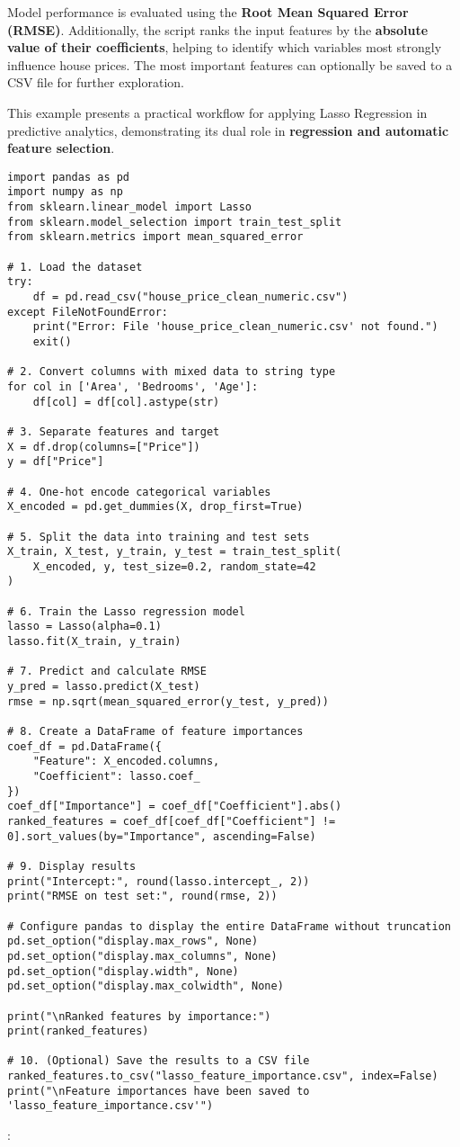 \documentclass[12pt, a4paper]{report}
\begin{document}
Model performance is evaluated using the \textbf{Root Mean Squared Error (RMSE)}. Additionally, the script ranks the input features by the \textbf{absolute value of their coefficients}, helping to identify which variables most strongly influence house prices. The most important features can optionally be saved to a CSV file for further exploration.

This example presents a practical workflow for applying Lasso Regression in predictive analytics, demonstrating its dual role in \textbf{regression and automatic feature selection}.

\begin{lstlisting}[style=pythonstyle]
import pandas as pd
import numpy as np
from sklearn.linear_model import Lasso
from sklearn.model_selection import train_test_split
from sklearn.metrics import mean_squared_error

# 1. Load the dataset
try:
    df = pd.read_csv("house_price_clean_numeric.csv")
except FileNotFoundError:
    print("Error: File 'house_price_clean_numeric.csv' not found.")
    exit()

# 2. Convert columns with mixed data to string type
for col in ['Area', 'Bedrooms', 'Age']:
    df[col] = df[col].astype(str)

# 3. Separate features and target
X = df.drop(columns=["Price"])
y = df["Price"]

# 4. One-hot encode categorical variables
X_encoded = pd.get_dummies(X, drop_first=True)

# 5. Split the data into training and test sets
X_train, X_test, y_train, y_test = train_test_split(
    X_encoded, y, test_size=0.2, random_state=42
)

# 6. Train the Lasso regression model
lasso = Lasso(alpha=0.1)
lasso.fit(X_train, y_train)

# 7. Predict and calculate RMSE
y_pred = lasso.predict(X_test)
rmse = np.sqrt(mean_squared_error(y_test, y_pred))

# 8. Create a DataFrame of feature importances
coef_df = pd.DataFrame({
    "Feature": X_encoded.columns,
    "Coefficient": lasso.coef_
})
coef_df["Importance"] = coef_df["Coefficient"].abs()
ranked_features = coef_df[coef_df["Coefficient"] != 0].sort_values(by="Importance", ascending=False)

# 9. Display results
print("Intercept:", round(lasso.intercept_, 2))
print("RMSE on test set:", round(rmse, 2))

# Configure pandas to display the entire DataFrame without truncation
pd.set_option("display.max_rows", None)
pd.set_option("display.max_columns", None)
pd.set_option("display.width", None)
pd.set_option("display.max_colwidth", None)

print("\nRanked features by importance:")
print(ranked_features)

# 10. (Optional) Save the results to a CSV file
ranked_features.to_csv("lasso_feature_importance.csv", index=False)
print("\nFeature importances have been saved to 'lasso_feature_importance.csv'")
\end{lstlisting}
\newpage:
\end{document}
